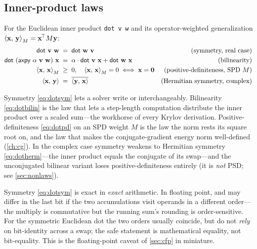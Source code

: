 \subsection{Inner-product laws}

\begin{lemma}
\label{lem:dot}
For the Euclidean inner product \lstinline[style=l4style]|dot v w| and its
operator-weighted generalization
$\left\langle \mathbf{x},\, \mathbf{y}\right\rangle_M = \mathbf{x}^{\!\top} M \mathbf{y}$:
\begin{align}
  \textsf{dot}\ \vv\ \vw &\;=\; \textsf{dot}\ \vw\ \vv
    & \text{(symmetry, real case)} \label{eq:dotsym}\\
  \textsf{dot}\ (\textsf{axpy}\ \alpha\ \vv\ \vw)\ \vx
    &\;=\; \alpha \cdot \textsf{dot}\ \vv\ \vx + \textsf{dot}\ \vw\ \vx
    & \text{(bilinearity)} \label{eq:dotbilin}\\
  \inner{\vx}{\vx}_M &\;\ge\; 0,\quad
    \inner{\vx}{\vx}_M = 0 \iff \vx = \mathbf{0}
    & \text{(positive-definiteness, SPD $M$)} \label{eq:dotpd}\\
  \inner{\vx}{\vy} &\;=\; \overline{\inner{\vy}{\vx}}
    & \text{(Hermitian symmetry, complex)} \label{eq:dotherm}
\end{align}
\end{lemma}

\noindent Symmetry \eqref{eq:dotsym} lets a solver write  or
 interchangeably. Bilinearity \eqref{eq:dotbilin} is the law that lets
a step-length computation distribute the inner product over a scaled sum---the
workhorse of every Krylov derivation. Positive-definiteness \eqref{eq:dotpd} on an
SPD weight $M$ is the law the norm  rests its square root on, and the law
that makes the conjugate-gradient energy norm well-defined (\cref{ch:cg}). In the
complex case symmetry weakens to Hermitian symmetry \eqref{eq:dotherm}---the inner
product equals the conjugate of its swap---and the unconjugated bilinear variant
 loses positive-definiteness entirely (it is \emph{not} PSD; see
\cref{sec:nonlaws}).

\begin{pitfall}
Symmetry \eqref{eq:dotsym} is exact in \emph{exact} arithmetic. In floating point,
 and  may differ in the last bit if the two
accumulations visit operands in a different order---the multiply is commutative but
the running sum's rounding is order-sensitive. For the symmetric Euclidean dot the
two orders usually coincide, but do not \emph{rely} on bit-identity across a swap;
the safe statement is mathematical equality, not bit-equality. This is the
floating-point caveat of \cref{sec:cfp} in miniature.
\end{pitfall}

